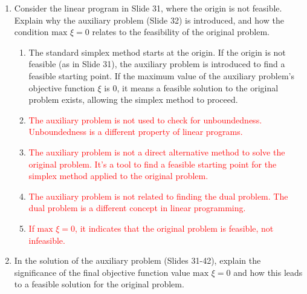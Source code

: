 \documentclass{article}%
\newcommand{\incorrect}[1]{\textcolor{red}{#1}}
\begin{document}
\begin{enumerate}
\begin{enumerate}
\begin{enumerate}
\item \incorrect{Negative coefficients in the objective function do not indicate infeasibility.  Infeasibility means there is no solution that satisfies all constraints.}%
\item \incorrect{Negative coefficients in the objective function do not indicate an unbounded problem. An unbounded problem has a solution where the objective function can be made arbitrarily large.}%
\item \incorrect{The coefficients of the non-basic variables are crucial in determining optimality.  Negative coefficients indicate that the current solution is optimal.}%
\item \incorrect{Negative coefficients in the final objective function indicate that the simplex method has converged to an optimal solution.}%
\end{enumerate}%
\vspace{0.5em}%
\item Consider the linear program in Slide 31, where the origin is not feasible. Explain why the auxiliary problem (Slide 32) is introduced, and how the condition $\text{max } \xi = 0$ relates to the feasibility of the original problem.%
\begin{enumerate}%
\item The standard simplex method starts at the origin. If the origin is not feasible (as in Slide 31), the auxiliary problem is introduced to find a feasible starting point.  If the maximum value of the auxiliary problem's objective function $\xi$ is 0, it means a feasible solution to the original problem exists, allowing the simplex method to proceed.%
\item \incorrect{The auxiliary problem is not used to check for unboundedness.  Unboundedness is a different property of linear programs.}%
\item \incorrect{The auxiliary problem is not a direct alternative method to solve the original problem. It's a tool to find a feasible starting point for the simplex method applied to the original problem.}%
\item \incorrect{The auxiliary problem is not related to finding the dual problem. The dual problem is a different concept in linear programming.}%
\item \incorrect{If $\text{max } \xi = 0$, it indicates that the original problem is feasible, not infeasible.}%
\end{enumerate}%
\vspace{0.5em}%
\item In the solution of the auxiliary problem (Slides 31-42), explain the significance of the final objective function value $\text{max } \xi = 0$ and how this leads to a feasible solution for the original problem.%

\end{enumerate}
\end{enumerate}
\end{document}
